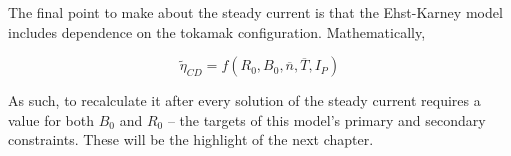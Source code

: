 \documentclass[11pt]{book}
\begin{document}
The final point to make about the steady current is that the Ehst-Karney model includes dependence on the tokamak configuration. Mathematically,

\begin{equation}
	\tilde \eta_{CD} = f( R_0, B_0, \overline n, \overline T, I_P )
\end{equation}

As such, to recalculate it after every solution of the steady current requires a value for both $B_0$ and $R_0$ -- the targets of this model's primary and secondary constraints. These will be the highlight of the next chapter.
\end{document}
